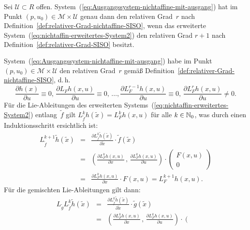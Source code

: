 \begin{proposition}
\label{prop:relativer-Grad-erweitertes-System}Sei $\mathcal{U}\subset R$
offen. System~(\ref{eq:Ausgangssystem-nichtaffine-mit-ausgang})
hat im Punkt $(p,u_{0})\in\mathcal{M}\times\mathcal{U}$ genau dann
den relativen Grad~$r$ nach Definition~\ref{def:relativer-Grad-nichtaffine-SISO},
wenn das erweiterte System~(\ref{eq:nichtaffin-erweitertes-System2})
den relativen Grad $r+1$ nach Definition~\ref{def:relativer-Grad-SISO}
besitzt.
\end{proposition}
\begin{svmultproof2}
System~(\ref{eq:Ausgangssystem-nichtaffine-mit-ausgang}) habe im
Punkt $(p,u_{0})\in\mathcal{M}\times\mathcal{U}$ den relativen Grad~$r$
gemäß Definition~\ref{def:relativer-Grad-nichtaffine-SISO}, d.\,h.
\begin{equation}
\frac{\partial h(x)}{\partial u}\equiv0,\,\frac{\partial L_{F}h(x,u)}{\partial u}\equiv0,\,\ldots,\frac{\partial L_{F}^{r-1}h(x,u)}{\partial u}\equiv0,\,\frac{\partial L_{F}^{r}h(x,u)}{\partial u}\neq0.\label{eq:beweis-erw-syst-rel-grad-nichtaffine}
\end{equation}
Für die Lie-Ableitungen des erweiterten Systems~(\ref{eq:nichtaffin-erweitertes-System2})
entlang~$\tilde{f}$ gilt $L_{\tilde{f}}^{k}h(\tilde{x})=L_{F}^{k}h(x,u)$
für alle $k\in{\mathbb{N}_0}$, was durch einen Induktionsschritt ersichtlich
ist:
\begin{eqnarray*}
L_{\tilde{f}}^{k+1}\tilde{h}(\tilde{x}) & = & \frac{\partial L_{\tilde{f}}^{k}\tilde{h}(\tilde{x})}{\partial\tilde{x}}\cdot\tilde{f}(\tilde{x})\\
 & = & \left(\frac{\partial L_{F}^{k}h(x,u)}{\partial x}\,,\,\frac{\partial L_{F}^{k}h(x,u)}{\partial u}\right)\cdot\left(\begin{array}{c}
F(x,u)\\
0
\end{array}\right)\\
 & = & \frac{\partial L_{F}^{k}h(x,u)}{\partial x}\cdot F(x,u)=L_{F}^{k+1}h(x,u).
\end{eqnarray*}
Für die gemischten Lie-Ableitungen gilt dann:
\begin{eqnarray*}
L_{\tilde{g}}L_{\tilde{f}}^{k}\tilde{h}(\tilde{x}) & = & \frac{\partial L_{\tilde{f}}^{k}\tilde{h}(\tilde{x})}{\partial\tilde{x}}\cdot\tilde{g}(\tilde{x})\\
 & = & \left(\frac{\partial L_{F}^{k}h(x,u)}{\partial x}\,,\,\frac{\partial L_{F}^{k}h(x,u)}{\partial u}\right)\cdot\left(\begin{array}{c}

\end{array}
\end{eqnarray*}
\end{svmultproof2}

